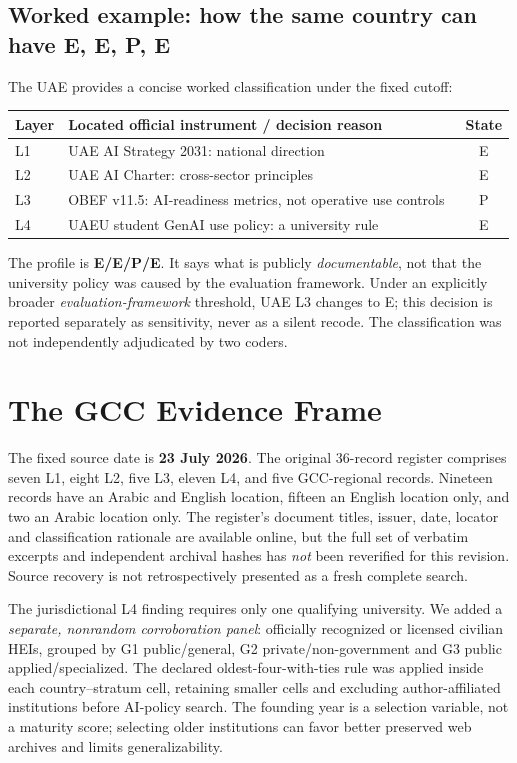 \documentclass[conference,letterpaper]{IEEEtran}
\begin{document}
\subsection{Worked example: how the same country can have E, E, P, E}
The UAE provides a concise worked classification under the fixed cutoff:
\begin{center}
\small\setlength{\tabcolsep}{4pt}
\begin{tabularx}{\columnwidth}{@{}p{}Xc@{}}
\toprule
Layer & Located official instrument / decision reason & State\\\midrule
L1 & UAE AI Strategy 2031: national direction~\cite{uaestrategy} & E\\
L2 & UAE AI Charter: cross-sector principles~\cite{uaecharter} & E\\
L3 & OBEF v11.5: AI-readiness metrics, not operative use controls~\cite{obef} & P\\
L4 & UAEU student GenAI use policy: a university rule~\cite{uaeupolicy} & E\\\bottomrule
\end{tabularx}
\end{center}
The profile is \textbf{E/E/P/E}. It says what is publicly \emph{documentable}, not that the university policy was caused by the evaluation framework. Under an explicitly broader \emph{evaluation-framework} threshold, UAE L3 changes to E; this decision is reported separately as sensitivity, never as a silent recode. The classification was not independently adjudicated by two coders.

\section{The GCC Evidence Frame}
The fixed source date is \textbf{23 July 2026}. The original 36-record register comprises seven L1, eight L2, five L3, eleven L4, and five GCC-regional records. Nineteen records have an Arabic and English location, fifteen an English location only, and two an Arabic location only. The register's document titles, issuer, date, locator and classification rationale are available online, but the full set of verbatim excerpts and independent archival hashes has \emph{not} been reverified for this revision. Source recovery is not retrospectively presented as a fresh complete search.

The jurisdictional L4 finding requires only one qualifying university. We added a \emph{separate, nonrandom corroboration panel}: officially recognized or licensed civilian HEIs, grouped by G1 public/general, G2 private/non-government and G3 public applied/specialized. The declared oldest-four-with-ties rule was applied inside each country--stratum cell, retaining smaller cells and excluding author-affiliated institutions before AI-policy search. The founding year is a selection variable, not a maturity score; selecting older institutions can favor better preserved web archives and limits generalizability.
\end{document}
